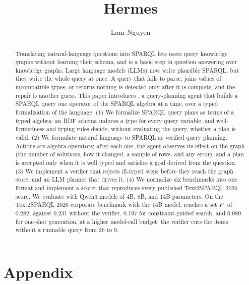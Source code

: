 \documentclass[sigconf, nonacm]{acmart}
\begin{document}
\title{Hermes}

\author{Lam Nguyen}

\begin{abstract}
Translating natural-language questions into SPARQL lets users query
knowledge graphs without learning their schema, and is a basic step in
question answering over knowledge graphs.
Large language models (LLMs) now write plausible SPARQL, but they write
the whole query at once.
A query that fails to parse, joins values of incompatible types, or
returns nothing is detected only after it is complete, and the repair
is another guess.
This paper introduces \hermes, a query-planning agent that builds a
SPARQL query one operator of the SPARQL algebra at a time, over a typed
formalization of the language.
(1) We formalize SPARQL query plans as terms of a typed algebra: an RDF
schema induces a type for every query variable, and well-formedness and
typing rules decide, without evaluating the query, whether a plan is
valid.
(2) We formulate natural language to SPARQL as verified query planning.
Actions are algebra operators; after each one, the agent observes its
effect on the graph (the number of solutions, how it changed, a sample
of rows, and any error); and a plan is accepted only when it is well
typed and satisfies a goal derived from the question.
(3) We implement a verifier that rejects ill-typed steps before they
reach the graph store, and an LLM planner that drives it.
(4) We normalize six benchmarks into one format and implement a scorer
that reproduces every published Text2SPARQL 2026 score.
We evaluate with Qwen3 models of 4B, 8B, and 14B parameters.
On the Text2SPARQL 2026 corporate benchmark with the 14B model,
\hermes reaches a set $F_1$ of 0.282, against 0.231 without the
verifier, 0.197 for constraint-guided search, and 0.089 for one-shot
generation, at a higher model-call budget; the verifier cuts the items
without a runnable query from 26 to 9.
\end{abstract}


\maketitle

\vldbtopmatter












\clearpage
\appendix
\section*{Appendix}

\end{document}
